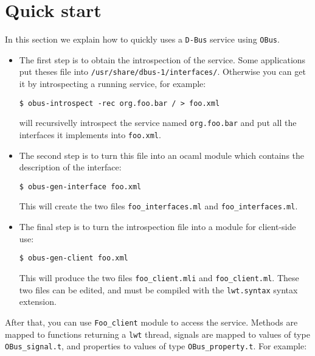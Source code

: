 \documentclass{article}
\newcommand{\obus}{\texttt{OBus}\xspace}
\newcommand{\dbus}{\texttt{D-Bus}\xspace}
\begin{document}
\section{Quick start}

In this section we explain how to quickly uses a \dbus service using
\obus.

\begin{itemize}
\item The first step is to obtain the introspection of the
  service. Some applications put theses file into
  \texttt{/usr/share/dbus-1/interfaces/}. Otherwise you can get it by
  introspecting a running service, for example:

  \lstset{language=bash}
  \begin{lstlisting}
$ obus-introspect -rec org.foo.bar / > foo.xml
  \end{lstlisting}

  will recursivelly introspect the service named \texttt{org.foo.bar}
  and put all the interfaces it implements into \texttt{foo.xml}.

\item The second step is to turn this file into an ocaml module which
  contains the description of the interface:

  \lstset{language=bash}
  \begin{lstlisting}
$ obus-gen-interface foo.xml
  \end{lstlisting}

  This will create the two files \texttt{foo\_interfaces.ml} and
  \texttt{foo\_interfaces.ml}.

\item The final step is to turn the introspection file into a module
  for client-side use:

  \lstset{language=bash}
  \begin{lstlisting}
$ obus-gen-client foo.xml
  \end{lstlisting}

  This will produce the two files \texttt{foo\_client.mli} and
  \texttt{foo\_client.ml}. These two files can be edited, and must be
  compiled with the \texttt{lwt.syntax} syntax extension.
\end{itemize}

After that, you can use \texttt{Foo\_client} module to access the
service.  Methods are mapped to functions returning a \texttt{lwt}
thread, signals are mapped to values of type \texttt{OBus\_signal.t},
and properties to values of type \texttt{OBus\_property.t}. For
example:
\end{document}
